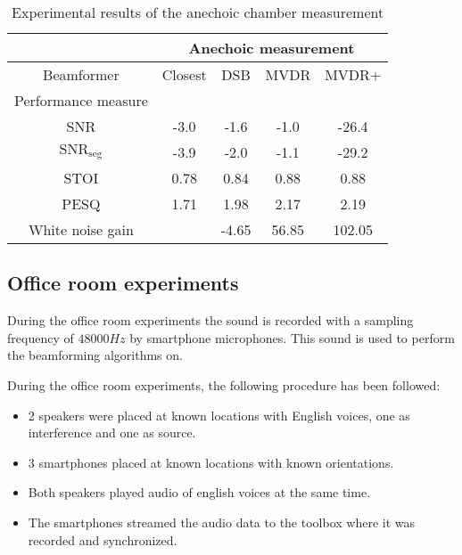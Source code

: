 \begin{table}[h]
\centering
\begin{tabular}{|c|c|c|c|c|} \hline
								
								& \multicolumn{4}{c|}{Anechoic measurement} \\ \hline
								
Beamformer						& Closest  	& DSB 	& MVDR 	& MVDR+ 	\\ \hline
														
Performance measure 			&			&		&		&			\\
																						
SNR 							& -3.0		& -1.6	& -1.0	& -26.4		  \\
																						
$\text{SNR}_\text{seg}$ 		& -3.9		& -2.0	& -1.1	& -29.2		  \\
																						
STOI    						& 0.78		& 0.84	& 0.88	& 0.88		  \\
																					
PESQ  							& 1.71		& 1.98	& 2.17	& 2.19		  \\
																
White noise gain 				&			& -4.65	& 56.85	& 102.05		 \\ \hline

\end{tabular}
\caption{Experimental results of the anechoic chamber measurement}
\label{tab:anechoic_res}
\end{table}




\subsection{Office room experiments}
During the office room experiments the sound is recorded with a sampling frequency of $48000 Hz$ by smartphone microphones. This sound is used to perform the beamforming algorithms on. 

During the office room experiments, the following procedure has been followed:

\begin{itemize}
\item 2 speakers were placed at known locations with English voices, one as interference and one as source.
\item 3 smartphones placed at known locations with known orientations.
\item Both speakers played audio of english voices at the same time.
\item The smartphones streamed the audio data to the \matlab toolbox where it was recorded and synchronized.
\end{itemize}

